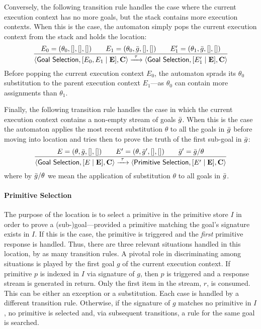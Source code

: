 \documentclass[12pt,a4paper,openright,twoside]{book}
\begin{document}
Conversely, the following transition rule handles the case where the current execution context has no more goals, but the stack contains
more execution contexts.
%
When this is the case, the automaton simply pops the current execution context from the stack and holds the  location:
\[
\frac{
    E_0 = (\theta_0, [], [], [])
    \qquad
    E_1 = (\theta_0, \bar{g}, [], [])
    \qquad
    E'_1 = (\theta_1, \bar{g}, [], [])
}{
    \langle \textsf{Goal Selection}, [E_0, E_1 \mid \mathbf{E}], \mathbf{C} \rangle
    \xrightarrow{\ \tau\ }
    \langle \textsf{Goal Selection}, [E'_1 \mid \mathbf{E}], \mathbf{C} \rangle
}
\]
%
Before popping the current execution context $E_0$, the automaton sprads its $\theta_0$ substitution to the parent execution context $E_1$---as $\theta_0$ can contain more assignments than $\theta_1$.

Finally, the following transition rule handles the case in which the current execution context contains a non-empty stream of goals $\bar{g}$.
%
When this is the case the automaton applies the most recent substitution $\theta$ to all the goals in $\bar{g}$ before moving into  location and tries then to prove the truth of the first sub-goal in $\bar{g}$:
%
\[
\frac{
    E = (\theta, \bar{g}, [], [])
    \qquad
    E' = (\theta, \bar{g}', [], [])
    \qquad
    \bar{g}' = \bar{g} / \theta
}{
    \langle \textsf{Goal Selection}, [E \mid \mathbf{E}], \mathbf{C} \rangle
    \xrightarrow{\ \tau\ }
    \langle \textsf{Primitive Selection}, [E' \mid \mathbf{E}], \mathbf{C} \rangle
}
\]
%
where by $\bar{g} / \theta$ we mean the application of substitution $\theta$ to all goals in $\bar{g}$.


\paragraph{Primitive Selection}

The purpose of the  location is to select a primitive in the primitive store $I$ in order to prove a (sub-)goal---provided a primitive matching the goal's signature exists in $I$.
%
If this is the case, the primitive is triggered and the \emph{first} primitive response is handled.
%
Thus, there are three relevant situations handled in this location, by as many transition rules.
%
A pivotal role in discriminating among situations is played by the first goal $g$ of the current execution context.
%
If primitive $p$ is indexed in $I$ via signature of $g$, then $p$ is triggered and a response stream is generated in return.
%
Only the first item in the stream, $r$, is consumed.
%
This can be either an exception or a substitution. Each case is handled by a different transition rule.
%
Otherwise, if the signature of $g$ matches no primitive in $I$, no primitive is selected and, via subsequent transitions, a rule for the same goal is searched.
\end{document}
